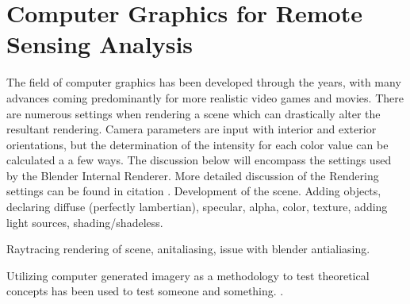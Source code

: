 \section{Computer Graphics for Remote Sensing Analysis}
The field of computer graphics has been developed through the years, with many advances coming predominantly for more realistic video games and movies.  There are numerous settings when rendering a scene which can drastically alter the resultant rendering.  Camera parameters are input with interior and exterior orientations, but the determination of the intensity for each color value can be calculated a a few ways.  The discussion below will encompass the settings used by the Blender Internal Renderer.  More detailed discussion of the Rendering settings can be found in citation .
Development of the scene.  Adding objects, declaring diffuse (perfectly lambertian), specular, alpha, color, texture, adding light sources, shading/shadeless.

Raytracing rendering of scene, anitaliasing, issue with blender antialiasing.  

Utilizing computer generated imagery as a methodology to test theoretical concepts has been used to test someone and something. .  